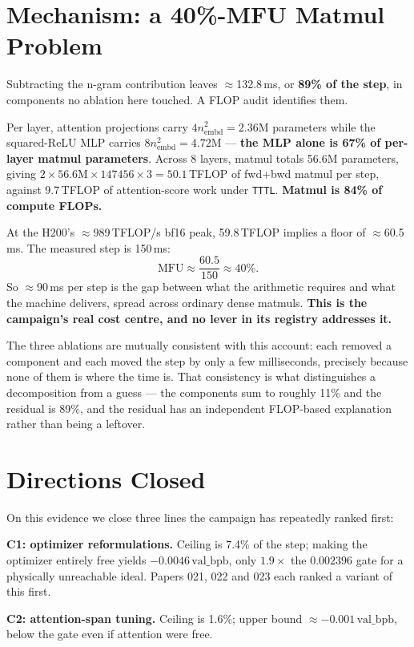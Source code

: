 \documentclass{article}
\newcommand{\vb}{\mathrm{val\_bpb}}
\begin{document}
\section{Mechanism: a 40\%-MFU Matmul Problem}
Subtracting the n-gram contribution leaves $\approx$132.8\,ms, or \textbf{89\% of the step}, in components no ablation here touched. A FLOP audit identifies them.

Per layer, attention projections carry $4n_\mathrm{embd}^2 = 2.36$M parameters while the squared-ReLU MLP carries $8n_\mathrm{embd}^2 = 4.72$M --- \textbf{the MLP alone is 67\% of per-layer matmul parameters}. Across 8 layers, matmul totals 56.6M parameters, giving $2 \times 56.6\mathrm{M} \times 147456 \times 3 = 50.1$\,TFLOP of fwd+bwd matmul per step, against 9.7\,TFLOP of attention-score work under \texttt{TTTL}. \textbf{Matmul is 84\% of compute FLOPs.}

At the H200's $\approx$989\,TFLOP/s bf16 peak, 59.8\,TFLOP implies a floor of $\approx$60.5\,ms. The measured step is 150\,ms:
\[
\mathrm{MFU} \approx \frac{60.5}{150} \approx 40\%.
\]
So $\approx$90\,ms per step is the gap between what the arithmetic requires and what the machine delivers, spread across ordinary dense matmuls. \textbf{This is the campaign's real cost centre, and no lever in its registry addresses it.}

The three ablations are mutually consistent with this account: each removed a component and each moved the step by only a few milliseconds, precisely because none of them is where the time is. That consistency is what distinguishes a decomposition from a guess --- the components sum to roughly 11\% and the residual is 89\%, and the residual has an independent FLOP-based explanation rather than being a leftover.

\section{Directions Closed}
On this evidence we close three lines the campaign has repeatedly ranked first:

\textbf{C1: optimizer reformulations.} Ceiling is 7.4\% of the step; making the optimizer entirely free yields $-0.0046$\,$\vb$, only $1.9\times$ the $0.002396$ gate for a physically unreachable ideal. Papers 021, 022 and 023 each ranked a variant of this first.

\textbf{C2: attention-span tuning.} Ceiling is 1.6\%; upper bound $\approx-0.001$\,$\vb$, below the gate even if attention were free.
\end{document}
